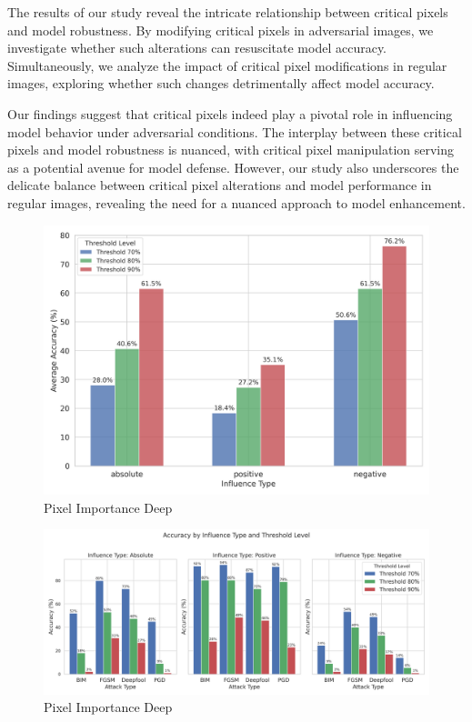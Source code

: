 \documentclass[10pt, conference, a4paper, final]{IEEEtran}
\begin{document}
  The results of our study reveal the intricate relationship between critical pixels and model robustness. By modifying critical pixels in adversarial images, we investigate whether such alterations can resuscitate model accuracy. Simultaneously, we analyze the impact of critical pixel modifications in regular images, exploring whether such changes detrimentally affect model accuracy.
  
  Our findings suggest that critical pixels indeed play a pivotal role in influencing model behavior under adversarial conditions. The interplay between these critical pixels and model robustness is nuanced, with critical pixel manipulation serving as a potential avenue for model defense. However, our study also underscores the delicate balance between critical pixel alterations and model performance in regular images, revealing the need for a nuanced approach to model enhancement.
  

\begin{figure}
    \centering
    \includegraphics[width=0.7\linewidth]{deepexplainer/correctinf.png}
    \caption{Pixel Importance Deep}
\end{figure}
\begin{figure}
    \centering
    \includegraphics[width=0.7\linewidth]{deepexplainer/deepadv.png}
    \caption{Pixel Importance Deep}
\end{figure}
\end{document}
